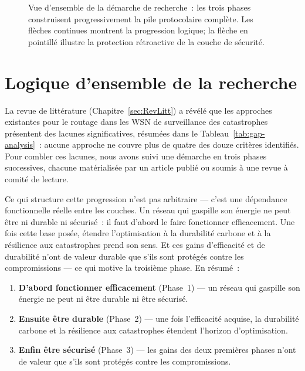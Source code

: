 \begin{figure}[htbp]
\caption{Vue d'ensemble de la démarche de recherche~: les trois phases construisent progressivement la pile protocolaire complète. Les flèches continues montrent la progression logique; la flèche en pointillé illustre la protection rétroactive de la couche de sécurité.}
\label{fig:demarche-globale}
\end{figure}


\section{Logique d'ensemble de la recherche}\label{sec:demarche-logique}

La revue de littérature (Chapitre~\ref{sec:RevLitt}) a révélé que les approches existantes pour le routage dans les WSN de surveillance des catastrophes présentent des lacunes significatives, résumées dans le Tableau~\ref{tab:gap-analysis}~: aucune approche ne couvre plus de quatre des douze critères identifiés. Pour combler ces lacunes, nous avons suivi une démarche en trois phases successives, chacune matérialisée par un article publié ou soumis à une revue à comité de lecture.

Ce qui structure cette progression n'est pas arbitraire --- c'est une dépendance fonctionnelle réelle entre les couches. Un réseau qui gaspille son énergie ne peut être ni durable ni sécurisé~: il faut d'abord le faire fonctionner efficacement. Une fois cette base posée, étendre l'optimisation à la durabilité carbone et à la résilience aux catastrophes prend son sens. Et ces gains d'efficacité et de durabilité n'ont de valeur durable que s'ils sont protégés contre les compromissions --- ce qui motive la troisième phase. En résumé~:

\begin{enumerate}
    \item \textbf{D'abord fonctionner efficacement} (Phase~1) --- un réseau qui gaspille son énergie ne peut ni être durable ni être sécurisé.
    \item \textbf{Ensuite être durable} (Phase~2) --- une fois l'efficacité acquise, la durabilité carbone et la résilience aux catastrophes étendent l'horizon d'optimisation.
    \item \textbf{Enfin être sécurisé} (Phase~3) --- les gains des deux premières phases n'ont de valeur que s'ils sont protégés contre les compromissions.
\end{enumerate}


